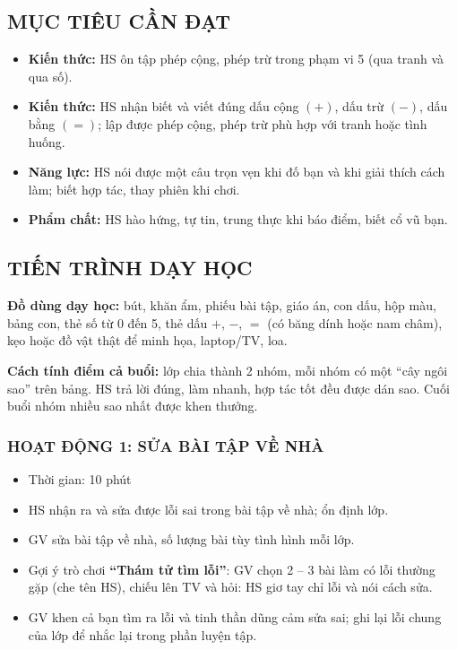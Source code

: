 \documentclass[../main.tex]{subfiles}
\begin{document}
\subsection{MỤC TIÊU CẦN ĐẠT}
\begin{itemize}
    \item \textbf{Kiến thức:} HS ôn tập phép cộng, phép trừ trong phạm vi 5 (qua tranh và qua số).
    \item \textbf{Kiến thức:} HS nhận biết và viết đúng dấu cộng $(+)$, dấu trừ $(-)$, dấu bằng $(=)$; lập được phép cộng, phép trừ phù hợp với tranh hoặc tình huống.
    \item \textbf{Năng lực:} HS nói được một câu trọn vẹn khi đố bạn và khi giải thích cách làm; biết hợp tác, thay phiên khi chơi.
    \item \textbf{Phẩm chất:} HS hào hứng, tự tin, trung thực khi báo điểm, biết cổ vũ bạn.
\end{itemize}

\subsection{TIẾN TRÌNH DẠY HỌC}
\textbf{Đồ dùng dạy học:} bút, khăn ẩm, phiếu bài tập, giáo án, con dấu, hộp màu, bảng con, thẻ số từ 0 đến 5, thẻ dấu $+$, $-$, $=$ (có băng dính hoặc nam châm), kẹo hoặc đồ vật thật để minh họa, laptop/TV, loa.

\begin{luuy}
    \textbf{Cách tính điểm cả buổi:} lớp chia thành 2 nhóm, mỗi nhóm có một “cây ngôi sao” trên bảng. HS trả lời đúng, làm nhanh, hợp tác tốt đều được dán sao. Cuối buổi nhóm nhiều sao nhất được khen thưởng.
\end{luuy}

\subsubsection{HOẠT ĐỘNG 1: SỬA BÀI TẬP VỀ NHÀ}
\begin{hd}
    \begin{itemize}
        \item Thời gian: 10 phút
        \item HS nhận ra và sửa được lỗi sai trong bài tập về nhà; ổn định lớp.
    \end{itemize}
\end{hd}
\begin{itemize}
    \item GV sửa bài tập về nhà, số lượng bài tùy tình hình mỗi lớp.
    \item Gợi ý trò chơi \textbf{“Thám tử tìm lỗi”}: GV chọn 2 -- 3 bài làm có lỗi thường gặp (che tên HS), chiếu lên TV và hỏi:  HS giơ tay chỉ lỗi và nói cách sửa.
    \item GV khen cả bạn tìm ra lỗi và tinh thần dũng cảm sửa sai; ghi lại lỗi chung của lớp để nhắc lại trong phần luyện tập.
\end{itemize}
\end{document}
